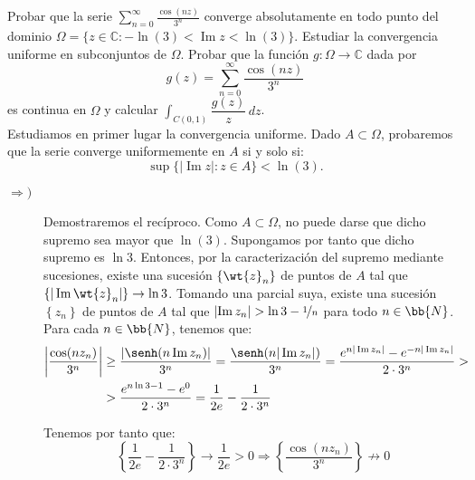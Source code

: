 \documentclass[12pt]{article}
\renewcommand{\Im}{\operatorname{Im}}
\begin{document}
    \newpage
    \setcounter{ejercicio}{0}

    \begin{ejercicio}[4 puntos]
        Probar que la serie $\displaystyle \sum_{n=0}^{\infty} \frac{\cos(nz)}{3^n}$ converge absolutamente en todo punto del dominio $\Omega = \{ z \in \mathbb{C} : -\ln(3) < \Im z < \ln(3) \}$. Estudiar la convergencia uniforme en subconjuntos de $\Omega$. Probar que la función $g : \Omega \to \mathbb{C}$ dada por
        \[
            g(z) = \sum_{n=0}^{\infty} \frac{\cos(nz)}{3^n}
        \]
        es continua en $\Omega$ y calcular $\displaystyle \int_{C(0,1)} \dfrac{g(z)}{z} \, dz$.\\

        Estudiamos en primer lugar la convergencia uniforme. Dado $A\subset \Omega$, probaremos que la serie converge uniformemente en $A$ si y solo si:
        \[
            \sup\{|\Im z| : z\in A\} < \ln(3).
        \]
        \begin{description}
            \item[$\Longrightarrow)$] Demostraremos el recíproco. Como $A\subset \Omega$, no puede darse que dicho supremo sea mayor que $\ln(3)$. Supongamos por tanto que dicho supremo es $\ln 3$. Entonces, por la caracterización del supremo mediante sucesiones, existe una sucesión $\left\{\wt{z}_n\right\}$ de puntos de $A$ tal que $\left\{|\Im \wt{z}_n|\right\}\to \ln 3$. Tomando una parcial suya, existe una sucesión $\left\{z_n\right\}$ de puntos de $A$ tal que $\left|\Im z_n\right|>\ln 3 - \nicefrac{1}{n}$ para todo $n\in \bb{N}$.\\
            
            Para cada $n\in \bb{N}$, tenemos que:
            \begin{align*}
                \left|\dfrac{\cos(nz_n)}{3^n}\right| &\geq \dfrac{\left|\senh(n\Im z_n)\right|}{3^{n}}
                = \dfrac{\senh(n|\Im z_n|)}{3^{n}}
                = \dfrac{e^{n|\Im z_n|}-e^{-n|\Im z_n|}}{2\cdot 3^{n}}
                > \\
                &> \dfrac{e^{n\ln 3 -1}-e^0}{2\cdot 3^{n}}
                = \dfrac{1}{2e} - \dfrac{1}{2\cdot 3^{n}}
            \end{align*}

            Tenemos por tanto que:
            \begin{equation*}
                \left\{\dfrac{1}{2e}-\dfrac{1}{2\cdot 3^{n}}\right\}\to \dfrac{1}{2e} > 0\Longrightarrow \left\{\dfrac{\cos(nz_n)}{3^n}\right\}\not\to 0
            \end{equation*}


\end{description}
\end{ejercicio}
\end{document}
